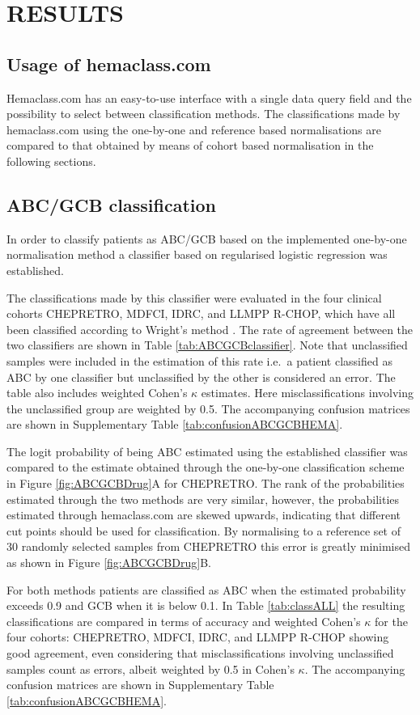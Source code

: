 \documentclass[10pt]{bmc_article}
\newenvironment{bmcformat}{\fussy\setboolean{publ}{true}}{\fussy}
\begin{document}
\begin{bmcformat}
\section*{RESULTS}
\subsection*{Usage of hemaclass.com}
Hemaclass.com has an easy-to-use interface with a single data query field and the possibility to select between classification methods. The classifications made by hemaclass.com using the one-by-one and reference based normalisations are compared to that obtained by means of cohort based normalisation in the following sections.

\subsection*{ABC/GCB classification}
In order to classify patients as ABC/GCB based on the implemented one-by-one normalisation method a classifier based on regularised logistic regression was established.

The classifications made by this classifier were evaluated in the four clinical cohorts CHEPRETRO, MDFCI, IDRC, and LLMPP R-CHOP, which have all been classified according to Wright's method \cite{Wright2003,Lenz2008a}. The rate of agreement between the two classifiers are shown in Table \ref{tab:ABCGCBclassifier}. Note that unclassified samples were included in the estimation of this rate i.e.\ a patient classified as ABC by one classifier but unclassified by the other is considered an error. The table also includes weighted Cohen's $\kappa$ estimates. Here misclassifications involving the unclassified group are weighted by 0.5. The accompanying confusion matrices are shown in Supplementary Table \ref{tab:confusionABCGCBHEMA}.

The logit probability of being ABC estimated using the established classifier was compared to the estimate obtained through the one-by-one classification scheme in Figure \ref{fig:ABCGCBDrug}A for CHEPRETRO. The rank of the probabilities estimated through the two methods are very similar, however, the probabilities estimated through hemaclass.com are skewed upwards, indicating that different cut points should be used for classification. By normalising to a reference set of 30 randomly selected samples from CHEPRETRO this error is greatly minimised as shown in Figure \ref{fig:ABCGCBDrug}B.

For both methods patients are classified as ABC when the estimated probability exceeds 0.9 and GCB when it is below 0.1. In Table \ref{tab:classALL} the resulting classifications are compared in terms of accuracy and weighted Cohen's $\kappa$ for the four cohorts: CHEPRETRO, MDFCI, IDRC, and LLMPP R-CHOP showing good agreement, even considering that misclassifications involving unclassified samples count as errors, albeit weighted by 0.5 in Cohen's $\kappa$. The accompanying confusion matrices are shown in Supplementary Table \ref{tab:confusionABCGCBHEMA}.


\end{bmcformat}
\end{document}
